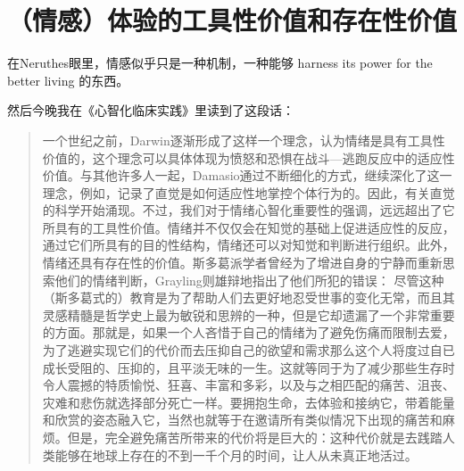 \chapter{（情感）体验的工具性价值和存在性价值}




在Neruthes眼里，情感似乎只是一种机制，一种能够 harness its power for the better living 的东西。

然后今晚我在《心智化临床实践》里读到了这段话：

\blockquote{
	一个世纪之前，Darwin逐渐形成了这样一个理念，认为情绪是具有工具性价值的，这个理念可以具体体现为愤怒和恐惧在战斗—逃跑反应中的适应性价值。与其他许多人一起，Damasio通过不断细化的方式，继续深化了这一理念，例如，记录了直觉是如何适应性地掌控个体行为的。因此，有关直觉的科学开始涌现。不过，我们对于情绪心智化重要性的强调，远远超出了它所具有的工具性价值。情绪并不仅仅会在知觉的基础上促进适应性的反应，通过它们所具有的目的性结构，情绪还可以对知觉和判断进行组织。此外，情绪还具有存在性的价值。斯多葛派学者曾经为了增进自身的宁静而重新思索他们的情绪判断，Grayling则雄辩地指出了他们所犯的错误：
	尽管这种（斯多葛式的）教育是为了帮助人们去更好地忍受世事的变化无常，而且其灵感精髓是哲学史上最为敏锐和思辨的一种，但是它却遗漏了一个非常重要的方面。那就是，如果一个人吝惜于自己的情绪为了避免伤痛而限制去爱，为了逃避实现它们的代价而去压抑自己的欲望和需求那么这个人将度过自已成长受阻的、压抑的，且平淡无味的一生。这就等同于为了减少那些生存时令人震撼的特质\pozhehao{}愉悦、狂喜、丰富和多彩，以及与之相匹配的痛苦、沮丧、灾难和悲伤\pozhehao{}就选择部分死亡一样。要拥抱生命，去体验和接纳它，带着能量和欣赏的姿态融入它，当然也就等于在邀请所有类似情况下出现的痛苦和麻烦。但是，完全避免痛苦所带来的代价将是巨大的：这种代价就是去践踏人类能够在地球上存在的不到一千个月的时间，让人从未真正地活过。
}

\tristarsepline

